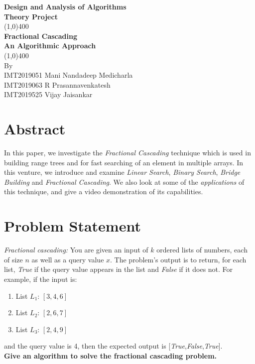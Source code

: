 \documentclass[11pt]{article}
\begin{document}
\begin{titlepage}
\begin{center}
\vspace*{0.5cm}
\Large{\textbf{Design and Analysis of Algorithms}}\\
\Large{\textbf{Theory Project}}\\
\vfill
\line(1,0){400}\\[1mm]
\huge{\textbf{Fractional Cascading}}\\[3mm]
\Large{\textbf{An Algorithmic Approach}}\\[1mm]
\line(1,0){400}\\
\vfill
By \\ 
IMT2019051 Mani Nandadeep Medicharla \\
IMT2019063 R Prasannavenkatesh \\
IMT2019525 Vijay Jaisankar \\
\end{center}
\end{titlepage}

\tableofcontents
\thispagestyle{empty}
\clearpage
\setcounter{page}{1}

\section{Abstract}
        In this paper, we investigate the \textit{Fractional Cascading} technique which is used in building range trees and for fast searching of an element in multiple arrays. In this venture, we introduce and examine \textit{Linear Search}, \textit{Binary Search}, \textit{Bridge Building} and \textit{Fractional Cascading}. We also look at some of the \textit{applications} of this technique, and give a video demonstration of its capabilities. 

\section{Problem Statement}
\textit{Fractional cascading: }You are given an input of $k$ ordered lists of numbers, each of size $n$ as well as a query value $x$. The problem's output is
to return, for each list, \textit{True} if the query value appears in the list and
\textit{False} if it does not. For example, if the input is:
\begin{enumerate}[label=(\alph*)]
    \item List $L_1$: $[3,4,6]$
    \item List $L_2$: $[2,6,7]$
    \item List $L_3$: $[2,4,9]$
\end{enumerate}
and the query value is 4, then the expected output is [\textit{True},\textit{False},\textit{True}]. \\
\textbf{Give an algorithm to solve the fractional cascading problem.}
\end{document}
